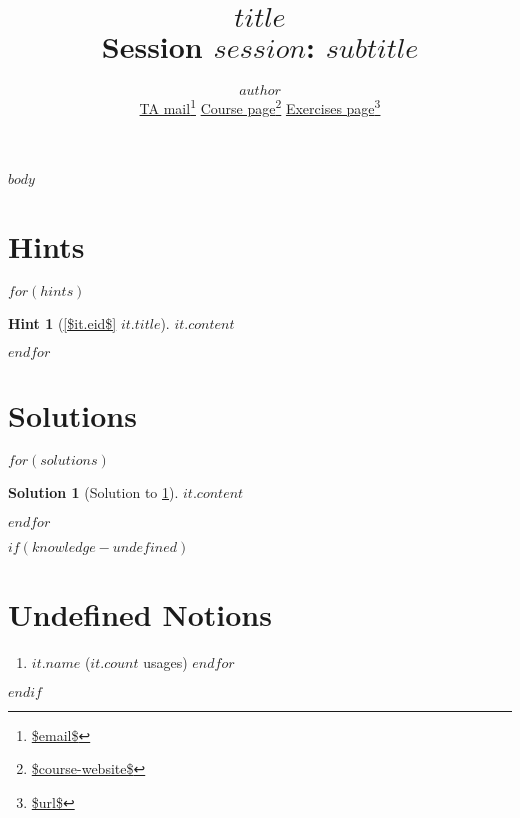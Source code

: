 \documentclass[a4,10pt]{article}
\title{{\bfseries \Huge{$title$}} \\ Session $session$: $subtitle$}
\author{$author$ \\
        \href{mailto:$email$}{TA mail}\footnote{\url{$email$}}
        \hspace{1em}
        \href{$course-website$}{Course page}\footnote{\url{$course-website$}}
        \hspace{1em}
        \href{$url$}{Exercises page}\footnote{\url{$url$}}
}
\newtheorem{hint}{Hint}
\newtheorem{solution}{Solution}
\begin{document}
\maketitle

$body$

\printbibliography


\clearpage
\appendix

\section{Hints}

$for(hints)$
\begin{hint}[{\cref{$it.eid$} $it.title$}]
    \label{$it.id$}
    $it.content$
\end{hint}
$endfor$

\clearpage
\section{Solutions}

$for(solutions)$
\begin{solution}[Solution to \cref{$it.id$}]
    \label{$it.id$:solution}
    $it.content$
\end{solution}
$endfor$

$if(knowledge-undefined)$
\clearpage
\section{Undefined Notions}
\begin{enumerate}
$for(knowledge-undefined)$
\item \texttt{$it.name$} ($it.count$ usages)
$endfor$
\end{enumerate}
$endif$
\end{document}
